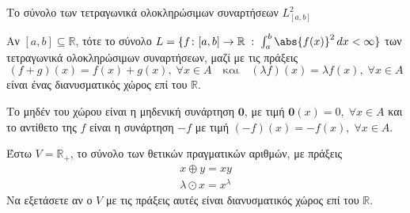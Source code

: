 \documentclass[a4paper,table]{report}
\begin{document}
\begin{example}
  \textcolor{Col2}{Το σύνολο  των τετραγωνικά ολοκληρώσιμων συναρτήσεων 
  $ L^{2}_{[a,b]} $} 

  Αν $ [a,b] \subseteq \mathbb{R} $, τότε το σύνολο 
    $ L=\{f \colon [a,b] \to \mathbb{R} \; : \; \int _{a}^{b}
  \abs{f(x)}^{2} \,{dx} < \infty\} $ των τετραγωνικά ολοκληρώσιμων συναρτήσεων, μαζί με 
  τις πράξεις
  \[
    (f+g)(x) = f(x) +g(x), \; \forall x \in A \quad \text{και} 
    \quad (\lambda f)(x)= \lambda f(x), \; \forall x \in A
  \] 
  είναι ένας διανυσματικός χώρος επί του $ \mathbb{R} $.

  Το μηδέν του χώρου είναι η μηδενική συνάρτηση $ \mathbf{0} $, με τιμή 
  $ \mathbf{0}(x)=0, \; \forall x \in A $ και το αντίθετο της $f$ είναι 
  η συνάρτηση $ -f $ με τιμή $ (-f)(x) = - f(x), \; \forall x \in A $.
\end{example}

\begin{exercise}
  Έστω $ V = \mathbb{R}_{+} $, το σύνολο των θετικών πραγματικών αριθμών, με 
  πράξεις
  \begin{gather*}
    x \oplus y = xy \\
    \lambda \odot x = x^{\lambda}
  \end{gather*} 
  Να εξετάσετε αν ο $V$ με τις πράξεις αυτές είναι διανυσματικός χώρος επί του 
  $ \mathbb{R} $.
\end{exercise}
\end{document}
